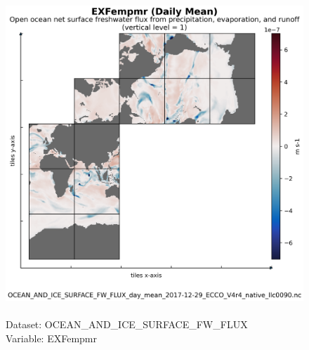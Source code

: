 \begin{figure}[H]
\centering
\includegraphics[scale=0.5]{../images/plots/native_plots/Ocean_and_Sea-Ice_Surface_Freshwater_Fluxes/EXFempmr.png}
\caption{\\Dataset: OCEAN\_AND\_ICE\_SURFACE\_FW\_FLUX\\Variable: EXFempmr}
\label{tab:table-OCEAN_AND_ICE_SURFACE_FW_FLUX_EXFempmr-Plot}
\end{figure}
\pagebreak
